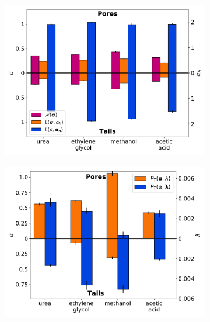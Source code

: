 \documentclass[aps,pre,preprint,groupedaddress,longbibliography]{revtex4-2}
\begin{document}
  \begin{figure}
  \centering
  \begin{subfigure}{0.325\textwidth}
  \includegraphics[width=\textwidth]{2mode_AD_hops.pdf}
  \caption{}\label{fig:2mode_AD_hops}
  \end{subfigure}
  \begin{subfigure}{0.325\textwidth}
  \includegraphics[width=\textwidth]{2mode_AD_dwells.pdf}
  \caption{}\label{fig:2mode_AD_dwells}
  \end{subfigure}
  \begin{subfigure}{0.325\textwidth}

\end{subfigure}
\end{figure}
\end{document}
